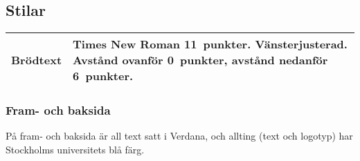 




\subsection{Stilar}

\begin{longtable}{| p{} | p{} |}
  \hline
  Brödtext &
  Times New Roman 11~punkter. Vänsterjusterad.
  Avstånd ovanför 0~punkter, avstånd nedanför 6~punkter.
  \\\hline
\end{longtable}


\subsubsection{Fram- och baksida}

På fram- och baksida är all text satt i Verdana, och allting (text och logotyp)
har Stockholms universitets blå färg.

